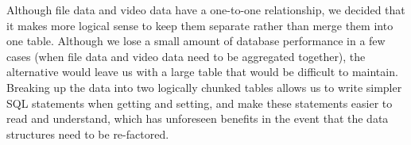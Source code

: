 \documentclass[a4paper,12pt]{report}
\begin{document}
Although file data and video data have a one-to-one relationship, we decided that it makes more logical sense to keep them separate rather than merge them into one table. 
Although we lose a small amount of database performance in a few cases (when file data and video data need to be aggregated together), the alternative would leave us with a large table that would be difficult to maintain. Breaking up the data into two logically chunked tables allows us to write simpler SQL statements when getting and setting, and make these statements easier to read and understand, which has unforeseen benefits in the event that the data structures need to be re-factored.
\end{document}
